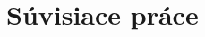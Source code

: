 \documentclass[a4paper,conference]{IEEEtran}
\begin{document}

\section{Súvisiace práce}
\label{sec2}





\end{document}
